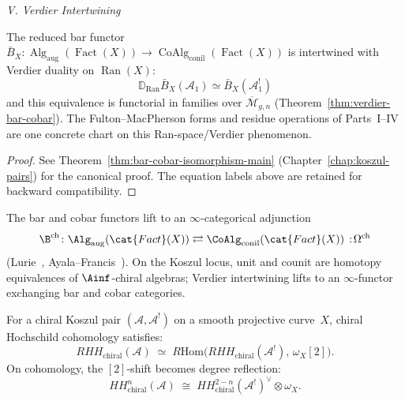 \begin{theorem}
\medskip
\noindent\emph{V. Verdier Intertwining}

The reduced bar functor
$\bar{B}_X \colon \operatorname{Alg}_{\mathrm{aug}}(\operatorname{Fact}(X))
\to \operatorname{CoAlg}_{\mathrm{conil}}(\operatorname{Fact}(X))$
is intertwined with Verdier duality on $\operatorname{Ran}(X)$:
\begin{equation}\label{eq:verdier-intertwining-main}
\mathbb{D}_{\operatorname{Ran}} \bar{B}_X(\mathcal{A}_1)
\simeq \bar{B}_X(\mathcal{A}_1^!)
\end{equation}
and this equivalence is functorial in families over
$\overline{\mathcal{M}}_{g,n}$
\textup{(}Theorem~\textup{\ref{thm:verdier-bar-cobar})}.
The Fulton--MacPherson forms and residue operations of
Parts~I--IV are one concrete chart on this Ran-space\slash Verdier phenomenon.
\end{theorem}

\begin{proof}
See Theorem~\ref{thm:bar-cobar-isomorphism-main}
(Chapter~\ref{chap:koszul-pairs}) for the canonical proof.
The equation labels above are retained for backward compatibility.
\end{proof}

\begin{remark}\label{rem:homotopy-native-a}
The bar and cobar functors lift to an $\infty$-categorical adjunction
\[
\B^{\mathrm{ch}} \colon
  \Alg_{\mathrm{aug}}(\cat{Fact}(X))
  \rightleftarrows
  \CoAlg_{\mathrm{conil}}(\cat{Fact}(X))
  \,:\!\Omega^{\mathrm{ch}}
\]
(Lurie~\cite[Chapter~5]{HA}, Ayala--Francis~\cite{AF15}).
On the Koszul locus, unit and counit are homotopy equivalences of
$\Ainf$-chiral algebras; Verdier intertwining lifts to an
$\infty$-functor exchanging bar and cobar categories.
\end{remark}

\begin{corollary}
\label{cor:hochschild-duality}
\label{cor:chiral-hochschild-duality}
For a chiral Koszul pair $(\mathcal{A}, \mathcal{A}^!)$ on a smooth projective curve~$X$,
chiral Hochschild cohomology satisfies:
\begin{equation}\label{eq:hochschild-duality-canonical}
RHH_{\mathrm{chiral}}(\mathcal{A})
\;\simeq\;
R\mathrm{Hom}\bigl(RHH_{\mathrm{chiral}}(\mathcal{A}^!),\,
\omega_X[2]\bigr).
\end{equation}
On cohomology, the $[2]$-shift becomes degree reflection:
\begin{equation}\label{eq:hochschild-duality-groups}
HH^n_{\mathrm{chiral}}(\mathcal{A})
\;\cong\; HH^{2-n}_{\mathrm{chiral}}(\mathcal{A}^!)^{\vee}
\otimes \omega_X.
\end{equation}
\end{corollary}

